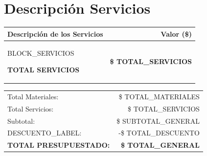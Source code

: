 \documentclass[10pt, letterpaper]{article}
\begin{document}
\vspace{0.4cm}


\section*{Descripción Servicios}

\begin{tabularx}{\textwidth}{Xr}

\toprule

\textbf{Descripción de los Servicios}
&
\textbf{Valor (\$)}
\\

\midrule

BLOCK_SERVICIOS

\midrule

\textbf{TOTAL SERVICIOS}
&
\textbf{\$ TOTAL_SERVICIOS}
\\

\bottomrule

\end{tabularx}

\vspace{0.6cm}


\begin{flushright}

\begin{tabular}{lr}


Total Materiales:
&
\$ TOTAL_MATERIALES
\\

Total Servicios:
&
\$ TOTAL_SERVICIOS
\\

Subtotal:
&
\$ SUBTOTAL_GENERAL
\\


DESCUENTO_LABEL:
&
-\$ TOTAL_DESCUENTO
\\

\midrule

\Large\textbf{TOTAL PRESUPUESTADO:}
&
\Large\textbf{\$ TOTAL_GENERAL}

\end{tabular}

\end{flushright}
\end{document}
